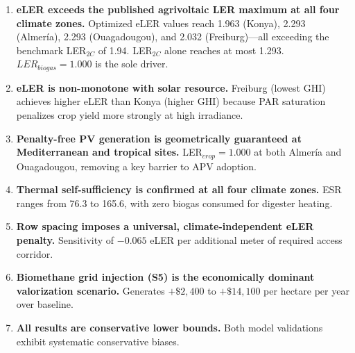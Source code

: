 \documentclass[12pt, a4paper]{article}
\begin{document}
\begin{enumerate}[leftmargin=*]
    \item \textbf{eLER exceeds the published agrivoltaic LER maximum at all four climate zones.} Optimized eLER values reach 1.963 (Konya), 2.293 (Almería), 2.293 (Ouagadougou), and 2.032 (Freiburg)—all exceeding the benchmark LER$_{2C}$ of 1.94. LER$_{2C}$ alone reaches at most 1.293. $LER_{biogas} = 1.000$ is the sole driver.

    \item \textbf{eLER is non-monotone with solar resource.} Freiburg (lowest GHI) achieves higher eLER than Konya (higher GHI) because PAR saturation penalizes crop yield more strongly at high irradiance.

    \item \textbf{Penalty-free PV generation is geometrically guaranteed at Mediterranean and tropical sites.} LER$_{crop} = 1.000$ at both Almería and Ouagadougou, removing a key barrier to APV adoption.

    \item \textbf{Thermal self-sufficiency is confirmed at all four climate zones.} ESR ranges from 76.3 to 165.6, with zero biogas consumed for digester heating.

    \item \textbf{Row spacing imposes a universal, climate-independent eLER penalty.} Sensitivity of $-0.065$ eLER per additional meter of required access corridor.

    \item \textbf{Biomethane grid injection (S5) is the economically dominant valorization scenario.} Generates $+\$2,400$ to $+\$14,100$ per hectare per year over baseline.

    \item \textbf{All results are conservative lower bounds.} Both model validations exhibit systematic conservative biases.
\end{enumerate}
\end{document}

